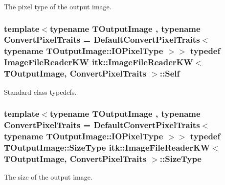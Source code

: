 The pixel type of the output image. \hypertarget{classitk_1_1_image_file_reader_k_w_a6616e1e0fe9f4aceb7f693250b5f5b5c}{
\subsubsection[{Self}]{\setlength{\rightskip}{0pt plus 5cm}template$<$typename T\-Output\-Image , typename Convert\-Pixel\-Traits  = Default\-Convert\-Pixel\-Traits$<$                    typename T\-Output\-Image\-::\-I\-O\-Pixel\-Type $>$$>$ typedef {\bf Image\-File\-Reader\-K\-W} {\bf itk\-::\-Image\-File\-Reader\-K\-W}$<$ T\-Output\-Image, Convert\-Pixel\-Traits $>$\-::{\bf Self}}}\label{classitk_1_1_image_file_reader_k_w_a6616e1e0fe9f4aceb7f693250b5f5b5c}
Standard class typedefs. \hypertarget{classitk_1_1_image_file_reader_k_w_a7a7f4acf918af20f820cdb57ab4ae18d}{
\subsubsection[{Size\-Type}]{\setlength{\rightskip}{0pt plus 5cm}template$<$typename T\-Output\-Image , typename Convert\-Pixel\-Traits  = Default\-Convert\-Pixel\-Traits$<$                    typename T\-Output\-Image\-::\-I\-O\-Pixel\-Type $>$$>$ typedef T\-Output\-Image\-::\-Size\-Type {\bf itk\-::\-Image\-File\-Reader\-K\-W}$<$ T\-Output\-Image, Convert\-Pixel\-Traits $>$\-::{\bf Size\-Type}}}\label{classitk_1_1_image_file_reader_k_w_a7a7f4acf918af20f820cdb57ab4ae18d}
The size of the output image. 

